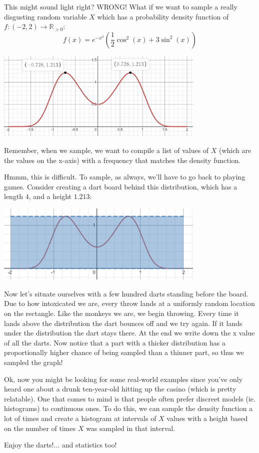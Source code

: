 \documentclass{article}
\begin{document}
This might sound light right? WRONG! What if we want to sample a really disgusting random variable $X$ which has a probability density function of $f:(-2,2)\rightarrow \mathbb{R}_{>0}$:
$$f(x)=e^{-x^4}\left(\frac{1}{2}\cos^2(x) + 3\sin^2(x)\right)$$
\begin{center}
    \includegraphics[width=10cm, scale=1.5]{images/ugly distribution.png}
\end{center}

Remember, when we sample, we want to compile a list of values of $X$ (which are the values on the x-axis) with a frequency that matches the density function.

Hmmm, this is difficult. To sample, as always, we'll have to go back to playing games. Consider creating a dart board behind this distribution, which has a length $4$, and a height $1.213$:
\begin{center}
    \includegraphics[width=10cm, scale=1.5]{images/ugly dartboard.png}
\end{center}

Now let's situate ourselves with a few hundred darts standing before the board. Due to how intoxicated we are, every throw lands at a uniformly random location on the rectangle. Like the monkeys we are, we begin throwing. Every time it lands above the distribution the dart bounces off and we try again. If it lands under the distribution the dart stays there. At the end we write down the x value of all the darts. Now notice that a part with a thicker distribution has a proportionally higher chance of being sampled than a thinner part, so thus we sampled the graph!

Ok, now you might be looking for some real-world examples since you've only heard one about a drunk ten-year-old hitting up the casino (which is pretty relatable). One that comes to mind is that people often prefer discreet models (ie. histograms) to continuous ones. To do this, we can sample the density function a lot of times and create a histogram at intervals of $X$ values with a height based on the number of times $X$ was sampled in that interval.

Enjoy the darts!... and statistics too!
\end{document}
